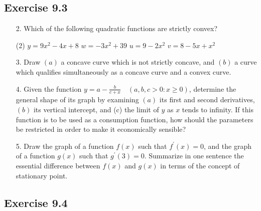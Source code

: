 \documentclass{./../../Latex/homework}
\begin{document}
\subsection*{Exercise 9.3}

\begin{enumerate}

\item[2.] Which of the following quadratic functions are strictly convex?
\begin{tasks}(2)
\task $y=9 x^{2}-4 x+8$
\task  $w=-3 x^{2}+39$
\task  $u=9-2 x^{2}$
\task  $v=8-5 x+x^{2}$
\end{tasks}

\item[3.] Draw $(a)$ a concave curve which is not strictly concave, and $(b)$ a curve which qualifies simultaneously as a concave curve and a convex curve.

\item[4.] Given the function $y=a-\frac{b}{c+x} \quad(a, b, c>0: x \geq 0)$, determine the general shape of its graph by examining $(a)$ its first and second derivatives, $(b)$ its vertical intercept, and (c) the limit of $y$ as $x$ tends to infinity. If this function is to be used as a consumption function, how should the parameters be restricted in order to make it economically sensible?

\item[5.] Draw the graph of a function $f(x)$ such that $f^{\prime}(x) = 0$, and the graph of a function $g(x)$ such that $g^{\prime}(3)=0$. Summarize in one sentence the essential difference between $f(x)$ and $g(x)$ in terms of the concept of stationary point.

\end{enumerate}

\subsection*{Exercise 9.4}
\end{document}
